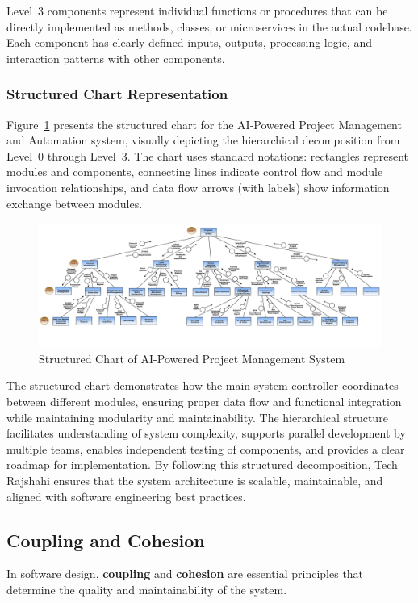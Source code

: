 \documentclass[12pt,a4paper]{article}
\begin{document}
Level~3 components represent individual functions or procedures that can be directly implemented as methods, classes, or microservices in the actual codebase.  Each component has clearly defined inputs, outputs, processing logic, and interaction patterns with other components.

\subsubsection{Structured Chart Representation}
Figure~\ref{fig:system_architecture} presents the structured chart for the AI‑Powered Project Management and Automation system, visually depicting the hierarchical decomposition from Level~0 through Level~3.  The chart uses standard notations: rectangles represent modules and components, connecting lines indicate control flow and module invocation relationships, and data flow arrows (with labels) show information exchange between modules.

\begin{figure}[H]
    \includegraphics[width=1.1\textwidth]{Fig/Structured_Chart.png}
    \caption{Structured Chart of AI-Powered Project Management System}
    \label{fig:system_architecture}
\end{figure}



The structured chart demonstrates how the main system controller coordinates between different modules, ensuring proper data flow and functional integration while maintaining modularity and maintainability.  The hierarchical structure facilitates understanding of system complexity, supports parallel development by multiple teams, enables independent testing of components, and provides a clear roadmap for implementation.  By following this structured decomposition, Tech Rajshahi ensures that the system architecture is scalable, maintainable, and aligned with software engineering best practices.

\subsection{Coupling and Cohesion}
In software design, \textbf{coupling} and \textbf{cohesion} are essential principles that determine the quality and maintainability of the system.
\end{document}
